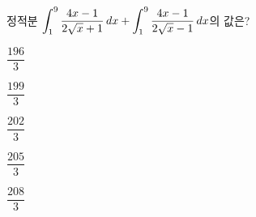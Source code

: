 정적분 $\displaystyle\int_{1}^{9}\dfrac{4x-1}{2\sqrt{x}+1}\mkern3mu dx+\int_{1}^{9}\dfrac{4x-1}{2\sqrt{x}-1}\mkern3mu dx$의 값은?
\begin{choices32}{\rule[-3ex]{0pt}{8ex}$\dfrac{196}{3}$}{\rule[-3ex]{0pt}{8ex}$\dfrac{199}{3}$}{\rule[-3ex]{0pt}{8ex}$\dfrac{202}{3}$}{\rule[-3ex]{0pt}{8ex}$\dfrac{205}{3}$}{\rule[-3ex]{0pt}{8ex}$\dfrac{208}{3}$}\end{choices32}
